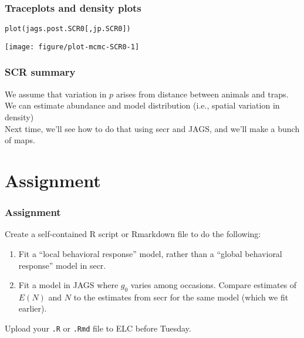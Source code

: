 \documentclass[color=usenames,dvipsnames]{beamer}\usepackage[]{graphicx}\usepackage[]{color}
\makeatletter
\newcommand{\hlstd}[1]{\textcolor[rgb]{0,0,0}{#1}}%
\newcommand{\hlkwd}[1]{\textcolor[rgb]{0.004,0.004,0.506}{#1}}%
\newenvironment{kframe}{%
 \def\at@end@of@kframe{}%
 \ifinner\ifhmode%
  \def\at@end@of@kframe{\end{minipage}}%
  \begin{minipage}{\columnwidth}%
 \fi\fi%
 \def\FrameCommand##1{\hskip\@totalleftmargin \hskip-\fboxsep
 \colorbox{shadecolor}{##1}\hskip-\fboxsep
     \hskip-\linewidth \hskip-\@totalleftmargin \hskip\columnwidth}%
 \MakeFramed {\advance\hsize-\width
   \@totalleftmargin\z@ \linewidth\hsize
   \@setminipage}}%
 {\par\unskip\endMakeFramed%
 \at@end@of@kframe}
\newenvironment{knitrout}{}{} %
\makeatother
\begin{document}
\begin{frame}[fragile]
  \frametitle{Traceplots and density plots}
\begin{knitrout}\footnotesize
{}\color{fgcolor}\begin{kframe}
\begin{alltt}
\hlkwd{plot}\hlstd{(jags.post.SCR0[,jp.SCR0])}
\end{alltt}
\end{kframe}

{\centering \texttt{[image: figure/plot-mcmc-SCR0-1]} 

}



\end{knitrout}
\end{frame}







\begin{frame}
  \frametitle{SCR summary}
  We assume that variation in $p$ arises from distance between animals
  and traps. \\
  \pause \vfill
  We can estimate abundance and model distribution (i.e., spatial
  variation in density) \\
  \pause \vfill
  Next time, we'll see how to do that using secr and JAGS, and we'll
  make a bunch of maps. \\
\end{frame}




\section{Assignment}




\begin{frame}[fragile]
  \frametitle{Assignment}
  Create a self-contained R script or Rmarkdown file to do the
  following: 
  \vfill
  \begin{enumerate}
    \item Fit a ``local behavioral response'' model,
      rather than a ``global behavioral response'' model in secr.
    \item Fit a model in JAGS where $g_0$ varies among
      occasions. Compare estimates of $E(N)$ and $N$ to the estimates
      from secr for the same model (which we fit earlier).
  \end{enumerate}
  \vfill
  Upload your {\tt .R} or {\tt .Rmd} file to ELC before Tuesday. 
\end{frame}
\end{document}
